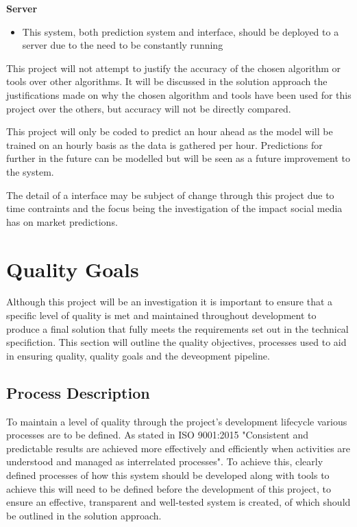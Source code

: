 \documentclass[oneside, 12pt]{article}
\begin{document}
		\textbf{Server}
		\begin{itemize}
			\item This system, both prediction system and interface, should be deployed to a server due to the need to be constantly running
		\end{itemize}
		
		This project will not attempt to justify the accuracy of the chosen algorithm or tools over other algorithms. It will be discussed in the solution approach the justifications made on why the chosen algorithm and tools have been used for this project over the others, but accuracy will not be directly compared.
		
		This project will only be coded to predict an hour ahead as the model will be trained on an hourly basis as the data is gathered per hour. Predictions for further in the future can be modelled but will be seen as a future improvement to the system.
		
		The detail of a interface may be subject of change through this project due to time contraints and the focus being the investigation of the impact social media has on market predictions.
	
	\newpage
	\section{Quality Goals}
	Although this project will be an investigation it is important to ensure that a specific level of quality is met and maintained throughout development to produce a final solution that fully meets the requirements set out in the technical specifiction. This section will outline the quality objectives, processes used to aid in ensuring quality, quality goals and the deveopment pipeline.
	
	\subsection{Process Description}
	To maintain a level of quality through the project's development lifecycle various processes are to be defined. As stated in ISO 9001:2015 \cite{ISO9000} "Consistent and predictable results are achieved more effectively and efficiently when activities are understood and managed as interrelated processes". To achieve this, clearly defined processes of how this system should be developed along with tools to achieve this will need to be defined before the development of this project, to ensure an effective, transparent and well-tested system is created, of which should be outlined in the solution approach.
	
\end{document}
